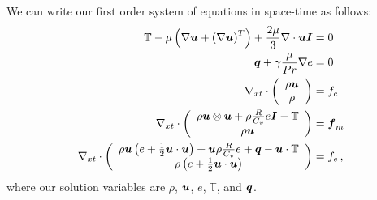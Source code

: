 \documentclass[Proposal.tex]{subfiles}
\begin{document}
We can write our first order system of equations in space-time as follows:
\begin{subequations}
\label{eq:compressibleNSFirstOrder}
\begin{align}
	\mathbb{T}-\mu\LRp{\Grad\bfu+\LRp{\Grad\bfu}^T}+\frac{2\mu}{3}\Div\bfu\bfI&=0\\
	\bfq+\gamma\frac{\mu}{Pr}\Grad e&=0\\
	\Divxt\vecttwo{\rho\bfu}{\rho}&=f_c\\
	\Divxt\vecttwo{\rho\bfu\otimes\bfu+\rho\frac{R}{C_v}e\bfI-\mathbb{T}}{\rho\bfu}&=\bff_m\\
	\Divxt\vecttwo{\rho\bfu\LRp{e+\frac{1}{2}\bfu\cdot\bfu}+\bfu\rho\frac{R}{C_v}e+\bfq-\bfu\cdot\mathbb{T}}{\rho\LRp{e+\frac{1}{2}\bfu\cdot\bfu}}&=f_e\,,
\end{align}
\end{subequations}
where our solution variables are $\rho$, $\bfu$, $e$, $\mathbb{T}$, and $\bfq$.
\end{document}
